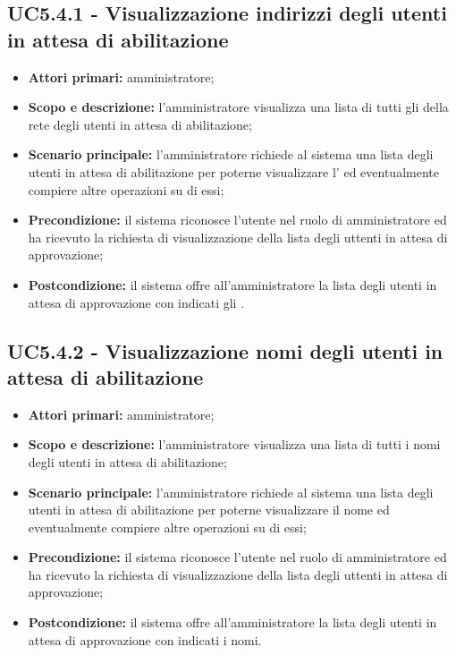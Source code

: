 \documentclass[AnalisiDeiRequisiti.tex]{subfiles}
\begin{document}
\subsection{UC5.4.1 - Visualizzazione indirizzi degli utenti in attesa di abilitazione}
\begin{itemize}
	\item \textbf{Attori primari:} amministratore;
	\item \textbf{Scopo e descrizione:} l'amministratore visualizza una lista di tutti gli  della rete  degli utenti in attesa di abilitazione;
	\item \textbf{Scenario principale:} l'amministratore richiede al sistema una lista degli utenti in attesa di abilitazione per poterne visualizzare l' ed eventualmente compiere altre operazioni su di essi;
	\item \textbf{Precondizione:} il sistema riconosce l'utente nel ruolo di amministratore ed ha ricevuto la richiesta di visualizzazione della lista degli uttenti in attesa di approvazione;
	\item \textbf{Postcondizione:} il sistema offre all'amministratore la lista degli utenti in attesa di approvazione con indicati gli .
\end{itemize}
\subsection{UC5.4.2 - Visualizzazione nomi degli utenti in attesa di abilitazione}
\begin{itemize}
	\item \textbf{Attori primari:} amministratore;
	\item \textbf{Scopo e descrizione:} l'amministratore visualizza una lista di tutti i nomi degli utenti in attesa di abilitazione;
	\item \textbf{Scenario principale:} l'amministratore richiede al sistema una lista degli utenti in attesa di abilitazione per poterne visualizzare il nome ed eventualmente compiere altre operazioni su di essi;
	\item \textbf{Precondizione:} il sistema riconosce l'utente nel ruolo di amministratore ed ha ricevuto la richiesta di visualizzazione della lista degli uttenti in attesa di approvazione;
	\item \textbf{Postcondizione:} il sistema offre all'amministratore la lista degli utenti in attesa di approvazione con indicati i nomi.
\end{itemize}
\end{document}
